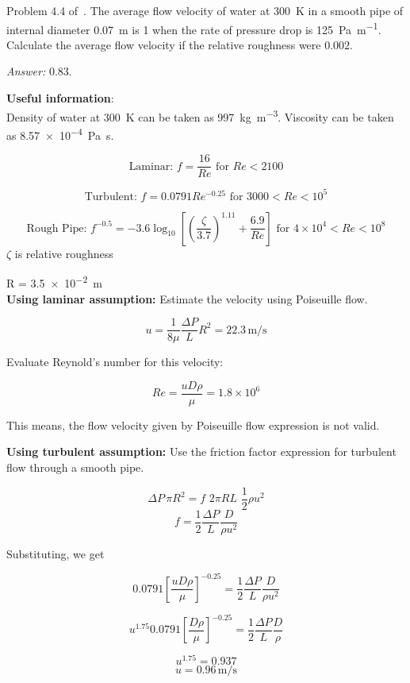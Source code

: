 \begin{question}
	Problem 4.4 of~\cite{gaskell}. The average flow velocity of water at \SI{300}{\kelvin} in a smooth pipe of internal diameter \SI{0.07}{\meter} is \SI{1}{\mps} when the rate of pressure drop is \SI{125}{\pascal\per\metre}. Calculate the average flow velocity if the relative roughness were $0.002$.
\end{question}
\begin{solution}[print]
{\it Answer:} \SI{0.83}{\mps}.

{\bf Useful information}:\\
Density of water at \SI{300}{\kelvin} can be taken as \SI{997}{\kilo\gram\per\meter\cubed}. Viscosity can be taken as \SI{8.57e-4}{\pascal\second}. 

$$\text{Laminar: } f = \frac{16}{Re} \text{ for } Re < 2100$$

$$\text{Turbulent: } f = 0.0791 Re^{-0.25} \text{ for } 3000 < Re < 10^5$$

$$\text{Rough Pipe: } f^{-0.5} = -3.6 \log_{10}\left[
\left(\frac{\zeta}{3.7}\right)^{1.11} + \frac{6.9}{Re} \right] \text{ for } 4
\times 10^4 < Re < 10^8$$ $\zeta$ is relative roughness


R = \SI{3.5e-2}{\meter}\\

{\bf Using laminar assumption:} Estimate the velocity using Poiseuille flow.

$$ u = \frac{1}{8 \mu} \frac{\Delta P}{L} R^2 = 22.3 \, \text{m/s} $$

Evaluate Reynold's number for this velocity:

$$ Re = \frac{u D \rho}{\mu} = 1.8 \times 10^6 $$

This means, the flow velocity given by Poiseuille flow expression is not valid.


{\bf Using turbulent assumption:} Use the friction factor expression for turbulent flow through a smooth pipe.

$$ \Delta P \, \pi R^2 = f \,\, 2 \pi R L \,\, \frac{1}{2} \rho u^2 $$
$$ f = \frac{1}{2} \frac{\Delta P}{L} \frac{D}{\rho u^2}$$

Substituting, we get

$$ 0.0791 \left[ \frac{u D \rho}{\mu} \right]^{-0.25} = \frac{1}{2} \frac{\Delta P}{L} \frac{D}{\rho u^2} $$

$$ u^{1.75} 0.0791 \left[ \frac{D \rho}{\mu} \right]^{-0.25}  =  \frac{1}{2} \frac{\Delta P}{L} \frac{D}{\rho}$$

$$ u^{1.75} = 0.937$$
$$ u = 0.96 \, \text{m/s}$$



\end{solution}
